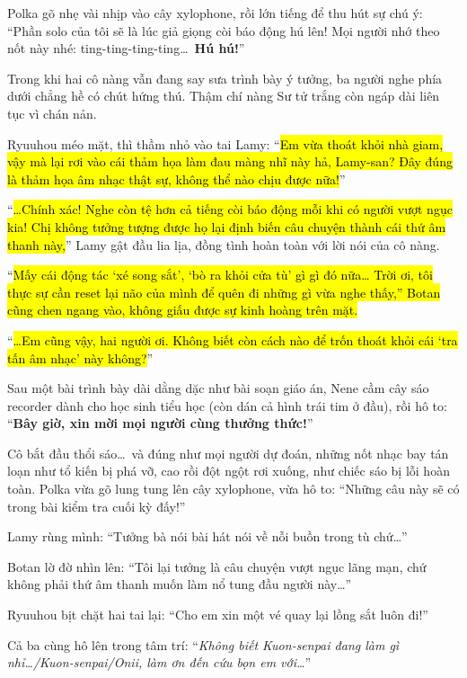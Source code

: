 \documentclass[../main.tex]{subfiles}
\begin{document}
Polka gõ nhẹ vài nhịp vào cây xylophone, rồi lớn tiếng để thu hút sự chú ý: ``Phần solo của tôi sẽ là lúc giả giọng còi báo động hú lên! Mọi người nhớ theo nốt này nhé: ting-ting-ting-ting\dots\ \textbf{Hú hú!}''

Trong khi hai cô nàng vẫn đang say sưa trình bày ý tưởng, ba người nghe phía dưới chẳng hề có chút hứng thú. Thậm chí nàng Sư tử trắng còn ngáp dài liên tục vì chán nản.

Ryuuhou méo mặt, thì thầm nhỏ vào tai Lamy: ``\hl{Em vừa thoát khỏi nhà giam, vậy mà lại rơi vào cái thảm họa làm đau màng nhĩ này hả, Lamy-san? Đây đúng là thảm họa âm nhạc thật sự, không thể nào chịu được nữa!}''

``\hl{\dots Chính xác! Nghe còn tệ hơn cả tiếng còi báo động mỗi khi có người vượt ngục kia! Chị không tưởng tượng được họ lại định biến câu chuyện thành cái thứ âm thanh này,}'' Lamy gật đầu lia lịa, đồng tình hoàn toàn với lời nói của cô nàng.

``\hl{Mấy cái động tác `xé song sắt', `bò ra khỏi cửa tù' gì gì đó nữa\dots{} Trời ơi, tôi thực sự cần reset lại não của mình để quên đi những gì vừa nghe thấy,'' Botan cũng chen ngang vào, không giấu được sự kinh hoàng trên mặt.}

``\hl{\dots Em cũng vậy, hai người ơi. Không biết còn cách nào để trốn thoát khỏi cái `tra tấn âm nhạc' này không?}''

Sau một bài trình bày dài dằng dặc như bài soạn giáo án, Nene cầm cây sáo recorder dành cho học sinh tiểu học (còn dán cả hình trái tim ở đầu), rồi hô to: ``\textbf{Bây giờ, xin mời mọi người cùng thưởng thức!}''

Cô bắt đầu thổi sáo\dots\ và đúng như mọi người dự đoán, những nốt nhạc bay tán loạn như tổ kiến bị phá vỡ, cao rồi đột ngột rơi xuống, như chiếc sáo bị lỗi hoàn toàn. Polka vừa gõ lung tung lên cây xylophone, vừa hô to: ``Những câu này sẽ có trong bài kiểm tra cuối kỳ đấy!''

Lamy rùng mình: ``Tưởng bà nói bài hát nói về nỗi buồn trong tù chứ\dots''

Botan lờ đờ nhìn lên: ``Tôi lại tưởng là câu chuyện vượt ngục lãng mạn, chứ không phải thứ âm thanh muốn làm nổ tung đầu người này\dots''

Ryuuhou bịt chặt hai tai lại: ``Cho em xin một vé quay lại lồng sắt luôn đi!''

Cả ba cùng hô lên trong tâm trí: ``\textit{Không biết Kuon-senpai đang làm gì nhỉ\dots/Kuon-senpai/Onii, làm ơn đến cứu bọn em với\dots}''
\end{document}
